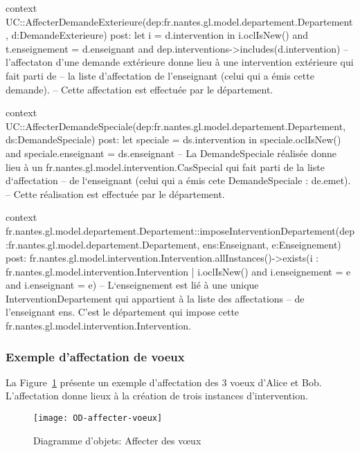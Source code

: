 \begin{ocl}
context UC::AffecterDemandeExterieure(dep:fr.nantes.gl.model.departement.Departement, d:DemandeExterieure)
post: let i = d.intervention in
	i.oclIsNew() and t.enseignement = d.enseignant and
	dep.interventions->includes(d.intervention)
-- l'affectaton d'une demande extérieure donne lieu à une intervention extérieure qui fait parti de 
-- la liste d'affectation de l'enseignant (celui qui a émis cette demande). 
-- Cette affectation est effectuée par le département.

\begin{ocl}
context UC::AffecterDemandeSpeciale(dep:fr.nantes.gl.model.departement.Departement, ds:DemandeSpeciale)
post: let speciale = ds.intervention in
	speciale.oclIsNew() and speciale.enseignant = ds.enseignant
-- La DemandeSpeciale réalisée donne lieu à un fr.nantes.gl.model.intervention.CasSpecial qui fait parti de la liste d`affectation
-- de l`enseignant (celui qui a émis cete DemandeSpeciale : de.emet). 
-- Cette réalisation est effectuée par le  département.
\end{ocl}

\begin{ocl}
context fr.nantes.gl.model.departement.Departement::imposeInterventionDepartement(dep:fr.nantes.gl.model.departement.Departement, ens:Enseignant, e:Enseignement)
post: fr.nantes.gl.model.intervention.Intervention.allInstances()->exists(i : fr.nantes.gl.model.intervention.Intervention |
	i.oclIsNew() and i.enseignement = e and i.enseignant = e)
-- L`enseignement est lié à une unique InterventionDepartement qui appartient à la liste des affectations 
-- de l'enseignant ens. C'est le département qui impose cette fr.nantes.gl.model.intervention.Intervention.
\end{ocl}


\subsubsection{Exemple d'affectation de voeux}
La Figure~\ref{fig:affectation} présente un exemple d'affectation des 3 voeux d'Alice et Bob.
L'affectation donne lieux à la création de trois instances d'intervention.

\begin{figure}[!htbp]
\begin{center}
\texttt{[image: OD-affecter-voeux]}
\caption{Diagramme d'objets: Affecter des vœux}\label{fig:affectation}
\end{center}
\end{figure}


\end{ocl}
